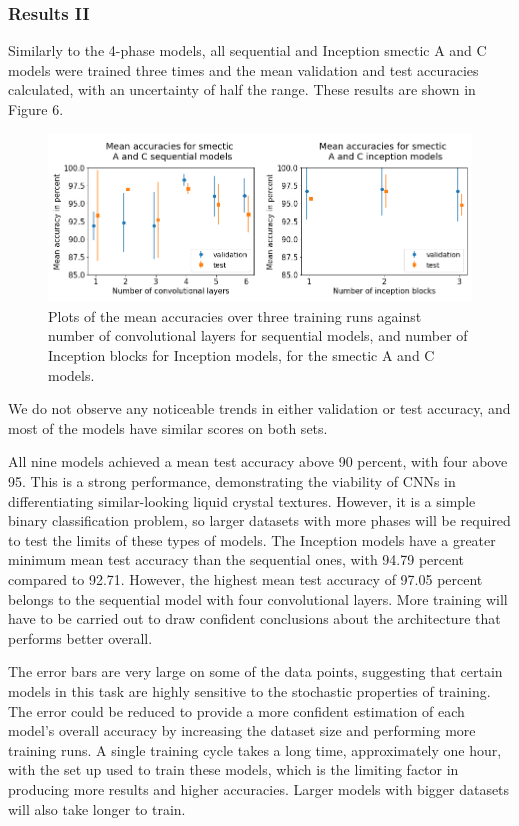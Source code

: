 \documentclass[12pt]{article}
\begin{document}
\subsubsection{Results II}
Similarly to the 4-phase models, all sequential and Inception smectic A and C models were trained three times and the mean validation and test accuracies calculated, with an uncertainty of half the range. These results are shown in Figure 6. 
\begin{figure}[!ht]
	\centering
    \includegraphics[width=5.6678in]{images/smecticAC_graphs.png}
    \caption{Plots of the mean accuracies over three training runs against number of convolutional layers for sequential models, and number of Inception blocks for Inception models, for the smectic A and C models.}
\end{figure} 
We do not observe any noticeable trends in either validation or test accuracy, and most of the models have similar scores on both sets.

All nine models achieved a mean test accuracy above 90 percent, with four above 95. This is a strong performance, demonstrating the viability of CNNs in differentiating similar-looking liquid crystal textures. However, it is a simple binary classification problem, so larger datasets with more phases will be required to test the limits of these types of models. The Inception models have a greater minimum mean test accuracy than the sequential ones, with 94.79 percent compared to 92.71. However, the highest mean test accuracy of 97.05 percent belongs to the sequential model with four convolutional layers. More training will have to be carried out to draw confident conclusions about the architecture that performs better overall.

The error bars are very large on some of the data points, suggesting that certain models in this task are highly sensitive to the stochastic properties of training. The error could be reduced to provide a more confident estimation of each model's overall accuracy by increasing the dataset size and performing more training runs. A single training cycle takes a long time, approximately one hour, with the set up used to train these models, which is the limiting factor in producing more results and higher accuracies. Larger models with bigger datasets will also take longer to train.
\end{document}
